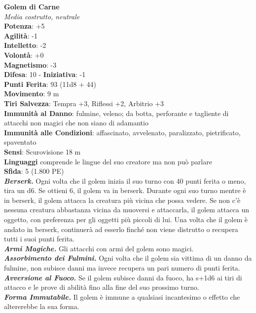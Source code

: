\begin{multicols}{2}
\medskip\textbf{Golem di Carne}\\
\emph{Media costrutto, neutrale}\\
\textbf{Potenza}: +5\\
\textbf{Agilità}: -1\\
\textbf{Intelletto}: -2\\
\textbf{Volontà}: +0\\
\textbf{Magnetismo}: -3\\
\textbf{Difesa}: 10 - \textbf{Iniziativa}: -1\\
\textbf{Punti Ferita}: 93 (11d8 + 44)\\
\textbf{Movimento}: 9 m\\
\textbf{Tiri Salvezza}: Tempra +3, Riflessi +2, Arbitrio +3\\
\textbf{Immunità al Danno}: fulmine, veleno; da botta, perforante e tagliente di attacchi non magici che non siano di adamantio\\
\textbf{Immunità alle Condizioni}: affascinato, avvelenato, paralizzato, pietrificato, spaventato\\
\textbf{Sensi}: Scurovisione 18 m\\
\textbf{Linguaggi} comprende le lingue del suo creatore ma non può parlare\\
\textbf{Sfida}: 5 (1.800 PE)\smallskip\\
\emph{\textbf{Berserk.}} Ogni volta che il golem inizia il suo turno con 40 punti ferita o meno, tira un d6. Se ottieni 6, il golem va in berserk. Durante ogni suo turno mentre è in berserk, il golem attacca la creatura più vicina che possa vedere. Se non c'è nessuna creatura abbastanza vicina da muoversi e attaccarla, il golem attacca un oggetto, con preferenza per gli oggetti più piccoli di lui. Una volta che il golem è andato in berserk, continuerà ad esserlo finché non viene distrutto o recupera tutti i suoi punti ferita.\\
\emph{\textbf{Armi Magiche.}} Gli attacchi con armi del golem sono magici.\\
\emph{\textbf{Assorbimento dei Fulmini.}} Ogni volta che il golem sia vittima di un danno da fulmine, non subisce danni ma invece recupera un pari numero di punti ferita.\\
\emph{\textbf{Avversione al Fuoco.}} Se il golem subisce danni da fuoco, ha s+1d6 ai tiri di attacco e le prove di abilità fino alla fine del suo prossimo turno.\\
\emph{\textbf{Forma Immutabile.}} Il golem è immune a qualsiasi incantesimo o effetto che altererebbe la sua forma.\\

\end{multicols}
